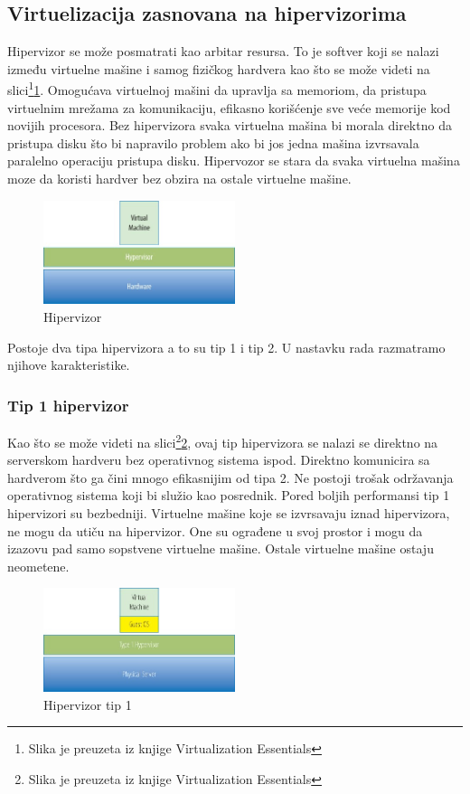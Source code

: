 \documentclass[12pt,oneside]{memoir}
\begin{document}
\subsection{Virtuelizacija zasnovana na hipervizorima}
Hipervizor se može posmatrati kao arbitar resursa. To je softver koji se nalazi između virtuelne mašine i samog fizičkog hardvera kao što se može videti na slici\footnote{Slika je preuzeta iz knjige Virtualization Essentials}\ref{fig:hipervizor}. Omogućava virtuelnoj mašini da upravlja sa memoriom, da pristupa virtuelnim mrežama za komunikaciju, efikasno korišćenje sve veće memorije kod novijih procesora\cite{ve}. Bez hipervizora svaka virtuelna mašina bi morala direktno da pristupa disku što bi napravilo problem ako bi jos jedna mašina izvrsavala paralelno operaciju pristupa disku. Hipervozor se stara da svaka virtuelna mašina moze da koristi hardver bez obzira na ostale virtuelne mašine.
\begin{figure}[!ht]
  \centering
  \includegraphics[width=0.5\textwidth]{Slika 1.jpg}
  \caption{Hipervizor}
  \label{fig:hipervizor}
\end{figure}
 
Postoje dva tipa hipervizora a to su tip 1 i tip 2. U nastavku rada razmatramo njihove karakteristike.
 
\subsubsection{Tip 1 hipervizor}
Kao što se može videti na slici\footnote{Slika je preuzeta iz knjige Virtualization Essentials}\ref{fig:hipervizorTip1}, ovaj tip hipervizora se nalazi se direktno na serverskom hardveru bez operativnog sistema ispod. Direktno komunicira sa hardverom što ga čini mnogo efikasnijim od tipa 2. Ne postoji trošak održavanja operativnog sistema koji bi služio kao posrednik. Pored boljih performansi tip 1 hipervizori su bezbedniji. Virtuelne mašine koje se izvrsavaju iznad hipervizora, ne mogu da utiču na hipervizor. One su ograđene u svoj prostor i mogu da izazovu pad samo sopstvene virtuelne mašine. Ostale virtuelne mašine ostaju neometene.
\begin{figure}[!ht]
  \centering
  \includegraphics[width=0.5\textwidth]{Slika 2.jpg}
  \caption{Hipervizor tip 1}
  \label{fig:hipervizorTip1}
\end{figure}
 
\end{document}
